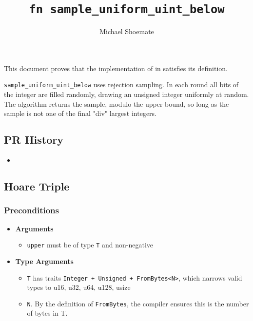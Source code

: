 \documentclass{article}
\title{\texttt{fn sample\_uniform\_uint\_below}}
\author{Michael Shoemate}
\begin{document}
\maketitle

\contrib

This document proves that the implementation of  in  
satisfies its definition.

\texttt{sample\_uniform\_uint\_below} uses rejection sampling. 
In each round all bits of the integer are filled randomly, drawing an unsigned integer uniformly at random.
The algorithm returns the sample, modulo the upper bound, so long as the sample is not one of the final "div" largest integers.

\subsection*{PR History}
\begin{itemize}
    \item {}
\end{itemize}

\subsection{Hoare Triple}
\subsubsection*{Preconditions}
\begin{itemize}
    \item \textbf{Arguments}
    \begin{itemize}
        \item \texttt{upper} must be of type \texttt{T} and non-negative
    \end{itemize}

    \item \textbf{Type Arguments}
    \begin{itemize}
        \item \texttt{T} has traits \texttt{Integer + Unsigned + FromBytes<N>}, which narrows valid types to u16, u32, u64, u128, usize
        \item \texttt{N}. By the definition of \texttt{FromBytes}, the compiler ensures this is the number of bytes in T.
    \end{itemize}
\end{itemize}
\end{document}
